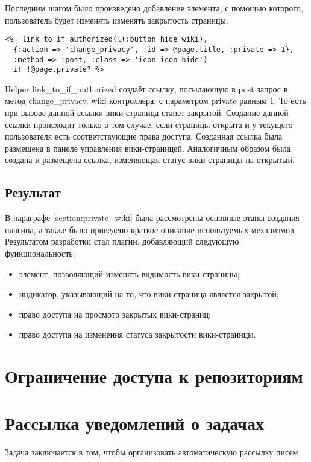Последним шагом было произведено добавление элемента, с помощью которого,
пользователь будет изменять изменять закрытость страницы.
\small{\begin{lstlisting}
<%= link_to_if_authorized(l(:button_hide_wiki), 
  {:action => 'change_privacy', :id => @page.title, :private => 1}, 
  :method => :post, :class => 'icon icon-hide') 
  if !@page.private? %>
\end{lstlisting}}
Helper link\_to\_if\_authorized создаёт ссылку, посылающую в post запрос в
метод change\_privacy, wiki контроллера, с параметром private равным 1. То есть
при вызове данной ссылки вики-страница станет закрытой. Создание данной ссылки
происходит только в том случае, если страницы открыта и у текущего пользователя
есть соответствующие права доступа. Созданная ссылка была размещена в панеле
управления вики-страницей. Аналогичным образом была создана и размещена ссылка,
изменяющая статус вики-страницы на открытый.

\subsection{Результат}
В параграфе \ref{section:private_wiki} была рассмотрены основные этапы создания
плагина, а также было приведено краткое описание используемых механизмов.
Результатом разработки стал плагин, добавляющий следующую функциональность:
\begin{itemize}
  \item элемент, позволяющий изменять видимость вики-страницы;
  \item индикатор, указывающий на то, что вики-страница является закрытой;
  \item право доступа на просмотр закрытых вики-страниц;
  \item право доступа на изменения статуса закрытости вики-страницы.
\end{itemize}

\section{Ограничение доступа к репозиториям}


\section{Рассылка уведомлений о задачах}
Задача заключается в том, чтобы организовать автоматическую рассылку писем



